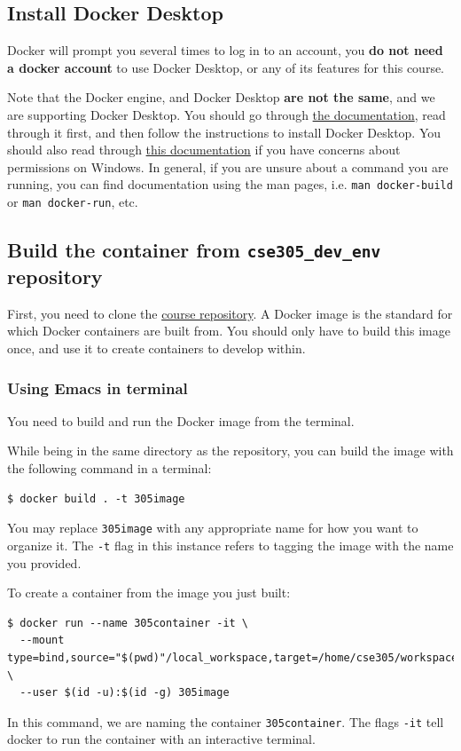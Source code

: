 \documentclass{extarticle}
\begin{document}
\subsection{Install Docker Desktop}
Docker will prompt you several times to log in to an account, you \textbf{do not need a docker account} to use Docker
Desktop, or any of its features for this course.

Note that the Docker engine, and Docker Desktop \textbf{are not the same}, and we are supporting Docker Desktop.
You should go through \href{https://docs.docker.com/desktop/setup/install/windows-install/}{the documentation},
read through it first, and then follow the instructions to install Docker Desktop. You should also read through
\href{https://docs.docker.com/desktop/setup/install/windows-permission-requirements/}{this documentation}
if you have concerns about permissions on Windows.
In general, if you are unsure about a command you are running, you can find documentation using the man
pages, i.e. \texttt{man docker-build} or \texttt{man docker-run}, etc.

\subsection{Build the container from \texttt{cse305\_dev\_env} repository}
First, you need to clone the \href{https://github.com/UB-CSE-305/cse305_dev_env}{course repository}.
A Docker image is the standard for which Docker containers are built from. You should only have to build
this image once, and use it to create containers to develop within.

\subsubsection{Using Emacs in terminal}
You need to build and run the Docker image from the terminal.

While being in the same directory as the repository, you can build the image with the following command in a
terminal:
\begin{lstlisting}
$ docker build . -t 305image
\end{lstlisting}
You may replace \texttt{305image} with any appropriate name for how you want to organize it.
The \texttt{-t} flag in this instance refers to tagging the image with the name you provided.

To create a container from the image you just built:
\begin{lstlisting}
$ docker run --name 305container -it \
  --mount type=bind,source="$(pwd)"/local_workspace,target=/home/cse305/workspace \
  --user $(id -u):$(id -g) 305image
\end{lstlisting}
In this command, we are naming the container \texttt{305container}. The flags \texttt{-it} tell docker to run the container
with an interactive terminal.
\end{document}
